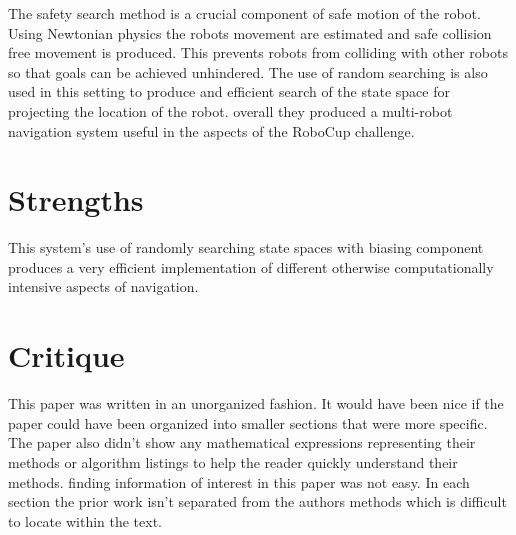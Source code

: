 \documentclass{article}
\begin{document}
The safety search method is a crucial component of safe motion of the robot. Using Newtonian physics the robots movement are estimated and safe collision free movement is produced. This prevents robots from colliding with other robots so that goals can be achieved unhindered. The use of random searching is also used in this setting to produce and efficient search of the state space for projecting the location of the robot. overall they produced a multi-robot navigation system useful in the aspects of the RoboCup challenge.
\section*{Strengths}
This system's use of randomly searching state spaces with biasing component produces a very efficient implementation of different otherwise computationally intensive aspects of navigation.
\section*{Critique}
This paper was written in an unorganized fashion. It would have been nice if the paper could have been organized into smaller sections that were more specific. The paper also didn't show any mathematical expressions representing their methods or algorithm listings to help the reader quickly understand their methods. finding information of interest in this paper was not easy. In each section the prior work isn't separated from the authors methods which is difficult to locate within the text.
\cite{1677952}
\end{document}
